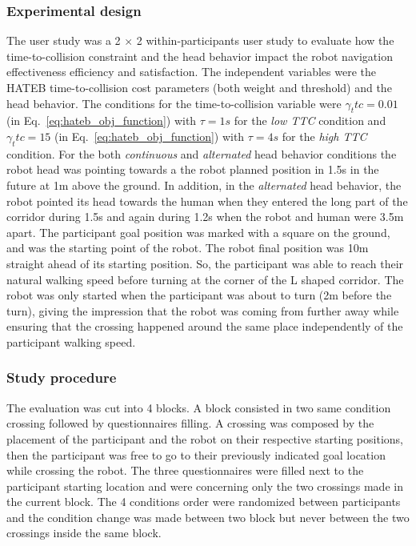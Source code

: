 \documentclass[a4paper,11pt,twoside]{StyleThese}
\begin{document}
\subsubsection{Experimental design}
The user study was a 2 $\times$ 2 within-participants user study to evaluate how the time-to-collision constraint and the head behavior impact the robot navigation effectiveness efficiency and satisfaction. The independent variables were the HATEB time-to-collision cost parameters (both weight and threshold) and the head behavior. The conditions for the time-to-collision variable were $\gamma_ttc = 0.01$ (in Eq.~\ref{eq:hateb_obj_function}) with $\tau = 1s$ for the \textit{low TTC} condition and $\gamma_ttc = 15$ (in Eq.~\ref{eq:hateb_obj_function}) with $\tau = 4s$ for the \textit{high TTC} condition. For the both \textit{continuous} and \textit{alternated} head behavior conditions the robot head was pointing towards a the robot planned position in 1.5s in the future at 1m above the ground. In addition, in the \textit{alternated} head behavior, the robot pointed its head towards the human when they entered the long part of the corridor during 1.5s and again during 1.2s when the robot and human were 3.5m apart.
The participant goal position was marked with a square on the ground, and was the starting point of the robot. The robot final position was 10m straight ahead of its starting position. So, the participant was able to reach their natural walking speed before turning at the corner of the L shaped corridor. The robot was only started when the participant was about to turn (2m before the turn), giving the impression that the robot was coming from further away while ensuring that the crossing happened around the same place independently of the participant walking speed.

\subsubsection{Study procedure}
The evaluation was cut into 4 blocks. A block consisted in two same condition crossing followed by questionnaires filling. A crossing was composed by the placement of the participant and the robot on their respective starting positions, then the participant was free to go to their previously indicated goal location while crossing the robot. The three questionnaires were filled next to the participant starting location and were concerning only the two crossings made in the current block. The 4 conditions order were randomized between participants and the condition change was made between two block but never between the two crossings inside the same block.
\end{document}
